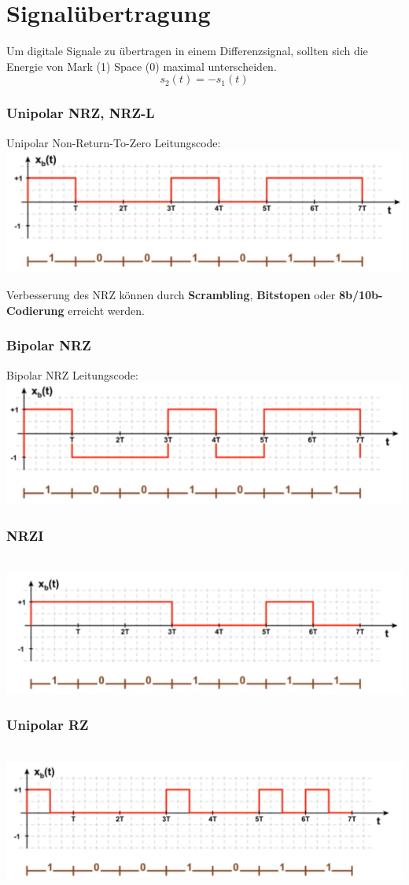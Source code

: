 \section{Signalübertragung}
Um digitale Signale zu übertragen in einem Differenzsignal, sollten sich die Energie von Mark (1) Space (0) maximal unterscheiden.
\[
s_2(t) = -s_1(t)
\]

\subsubsection{Unipolar NRZ, NRZ-L}
Unipolar Non-Return-To-Zero Leitungscode:\\
\includegraphics[width=0.6\columnwidth]{Images/nrz}

Verbesserung des NRZ können durch \textbf{Scrambling}, \textbf{Bitstopen} oder \textbf{8b/10b-Codierung} erreicht werden.

\subsubsection{Bipolar NRZ}
Bipolar NRZ Leitungscode:\\
\includegraphics[width=0.6\columnwidth]{Images/nrz1}

\subsubsection{NRZI}\\
\includegraphics[width=0.6\columnwidth]{Images/nrzi}

\subsubsection{Unipolar RZ}\\
\includegraphics[width=0.6\columnwidth]{Images/urz}

